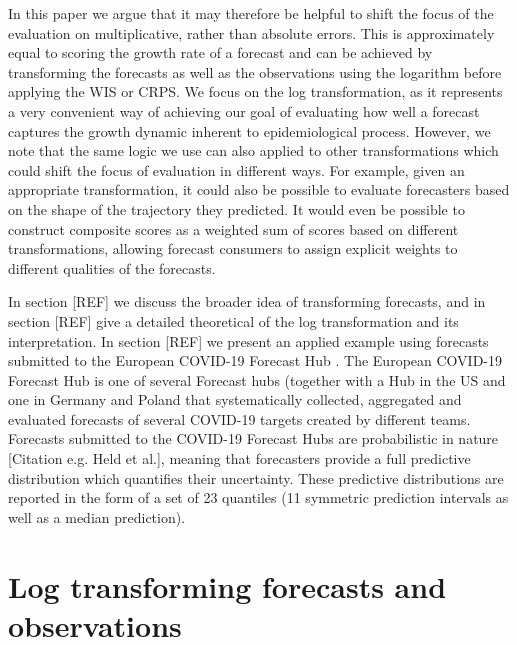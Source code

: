 \documentclass{article}
\begin{document}
In this paper we argue that it may therefore be helpful to shift the focus of the evaluation on multiplicative, rather than absolute errors. This is approximately equal to scoring the growth rate of a forecast and can be achieved by transforming the forecasts as well as the observations using the logarithm before applying the WIS or CRPS. We focus on the log transformation, as it represents a very convenient way of achieving our goal of evaluating how well a forecast captures the growth dynamic inherent to epidemiological process. However, we note that the same logic we use can also applied to other transformations which could shift the focus of evaluation in different ways. For example, given an appropriate transformation, it could also be possible to evaluate forecasters based on the shape of the trajectory they predicted. It would even be possible to construct composite scores as a weighted sum of scores based on different transformations, allowing forecast consumers to assign explicit weights to different qualities of the forecasts. 

In section [REF] we discuss the broader idea of transforming forecasts, and in section [REF] give a detailed theoretical of the log transformation and its interpretation. In section [REF] we present an applied example using forecasts submitted to the European COVID-19 Forecast Hub \citep{europeancovid-19forecasthubEuropeanCovid19Forecast2021, sherrattPredictivePerformanceMultimodel2022}. The European COVID-19 Forecast Hub is one of several Forecast hubs (together with a Hub in the US \citep{cramerEvaluationIndividualEnsemble2021} and one in Germany and Poland \citep{bracherShorttermForecastingCOVID192021} that systematically collected, aggregated and evaluated forecasts of several COVID-19 targets created by different teams. Forecasts submitted to the COVID-19 Forecast Hubs are probabilistic in nature [Citation e.g. Held et al.], meaning that forecasters provide a full predictive distribution which quantifies their uncertainty. These predictive distributions are reported in the form of a set of 23 quantiles (11 symmetric prediction intervals as well as a median prediction). 

\section{Log transforming forecasts and observations}
\end{document}
